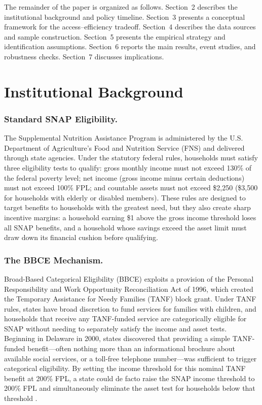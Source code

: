 \documentclass[12pt]{article}
\begin{document}
The remainder of the paper is organized as follows. Section~2 describes the institutional background and policy timeline. Section~3 presents a conceptual framework for the access--efficiency tradeoff. Section~4 describes the data sources and sample construction. Section~5 presents the empirical strategy and identification assumptions. Section~6 reports the main results, event studies, and robustness checks. Section~7 discusses implications.

\section{Institutional Background}

\subsubsection*{Standard SNAP Eligibility.} The Supplemental Nutrition Assistance Program is administered by the U.S. Department of Agriculture's Food and Nutrition Service (FNS) and delivered through state agencies. Under the statutory federal rules, households must satisfy three eligibility tests to qualify: gross monthly income must not exceed 130\% of the federal poverty level; net income (gross income minus certain deductions) must not exceed 100\% FPL; and countable assets must not exceed \$2,250 (\$3,500 for households with elderly or disabled members). These rules are designed to target benefits to households with the greatest need, but they also create sharp incentive margins: a household earning \$1 above the gross income threshold loses all SNAP benefits, and a household whose savings exceed the asset limit must draw down its financial cushion before qualifying.

\subsubsection*{The BBCE Mechanism.} Broad-Based Categorical Eligibility (BBCE) exploits a provision of the Personal Responsibility and Work Opportunity Reconciliation Act of 1996, which created the Temporary Assistance for Needy Families (TANF) block grant. Under TANF rules, states have broad discretion to fund services for families with children, and households that receive any TANF-funded service are categorically eligible for SNAP without needing to separately satisfy the income and asset tests. Beginning in Delaware in 2000, states discovered that providing a simple TANF-funded benefit---often nothing more than an informational brochure about available social services, or a toll-free telephone number---was sufficient to trigger categorical eligibility. By setting the income threshold for this nominal TANF benefit at 200\% FPL, a state could de facto raise the SNAP income threshold to 200\% FPL and simultaneously eliminate the asset test for households below that threshold \citep{cbpp2019bbce}.
\end{document}
